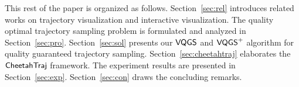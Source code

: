 \squishend



This rest of the paper is organized as follows. Section~\ref{sec:rel} introduces related works on trajectory visualization and interactive visualization. The quality optimal trajectory sampling problem is formulated and analyzed in Section~\ref{sec:pro}. Section~\ref{sec:sol} presents our $\mathsf{VQGS}$ and $\mathsf{VQGS}^+$ algorithm for quality guaranteed trajectory sampling. Section~\ref{sec:cheetahtraj} elaborates the $\mathsf{CheetahTraj}$ framework. The experiment results are presented in Section~\ref{sec:exp}. Section~\ref{sec:con} draws the concluding remarks.
